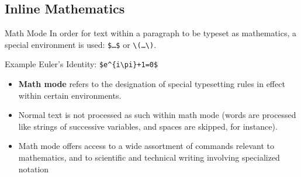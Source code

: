 \documentclass{beamer}
\begin{document}
\subsection{Inline Mathematics}

\begin{frame}{Math Mode}
In order for text within a paragraph to be typeset as mathematics, a special environment is used: \texttt{\$\dots\$} or \texttt{\textbackslash(\dots\textbackslash)}.

	\begin{exampleblock}{Example}
		Euler's Identity: \texttt{\$e\^{}\{i\textbackslash pi\}+1=0\$}
	\end{exampleblock}	\begin{itemize}
		\item<2-> \textbf{Math mode} refers to the designation of special typesetting rules in effect within certain environments.
		\item<3-> Normal text is not processed as such within math mode (words are processed like strings of successive variables, and spaces are skipped, for instance).
		\item<4-> Math mode offers access to a wide assortment of commands relevant to mathematics, and to scientific and technical writing involving specialized notation
	\end{itemize}
\end{frame}
\end{document}
